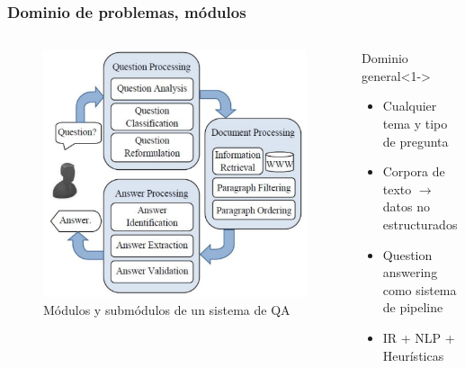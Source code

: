 \begin{frame}
\frametitle{Dominio de problemas, módulos}
\begin{columns}[T] %
\begin{column}{.48\textwidth}
  \begin{figure}
      \includegraphics[scale=0.3]{graficos/qa-open-domain}
    \caption{Módulos y submódulos de un sistema de QA}
    \label{fig:tareas}
  \end{figure}
\end{column}%
\hfill%
\begin{column}{.48\textwidth}

\begin{block}{Dominio general}<1->
      \begin{itemize}
          \item Cualquier tema y tipo de pregunta
          \item Corpora de texto $\rightarrow$ datos no estructurados
          \item Question answering como sistema de pipeline
          \item IR + NLP + Heurísticas
      \end{itemize}
    \end{block}
\end{column}%
\end{columns}

\end{frame}


